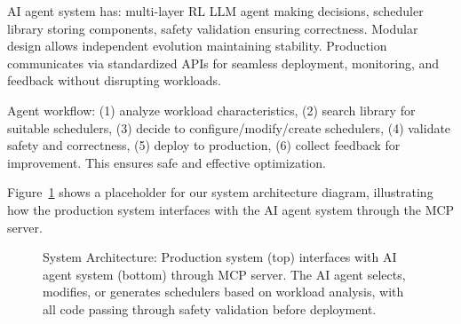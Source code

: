 AI agent system has: multi-layer RL LLM agent making decisions, scheduler library storing components, safety validation ensuring correctness. Modular design allows independent evolution maintaining stability. Production communicates via standardized APIs for seamless deployment, monitoring, and feedback without disrupting workloads.

Agent workflow: (1) analyze workload characteristics, (2) search library for suitable schedulers, (3) decide to configure/modify/create schedulers, (4) validate safety and correctness, (5) deploy to production, (6) collect feedback for improvement. This ensures safe and effective optimization.

Figure~\ref{fig:architecture} shows a placeholder for our system architecture diagram, illustrating how the production system interfaces with the AI agent system through the MCP server.

\begin{figure}[h]
\centering
{}
\caption{System Architecture: Production system (top) interfaces with AI agent system (bottom) through MCP server. The AI agent selects, modifies, or generates schedulers based on workload analysis, with all code passing through safety validation before deployment.}
\label{fig:architecture}
\end{figure}